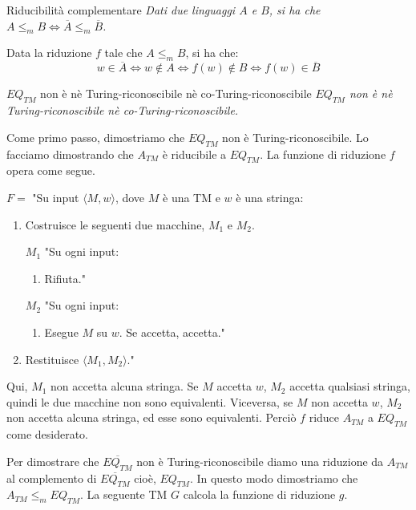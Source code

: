 \begin{Thm}{Riducibilità complementare}{}
\textit{Dati due linguaggi $A$ e $B$, si ha che $A\leq_m B\iff \overline{A}\leq_m \overline{B}$.}

\begin{demonstration}
Data la riduzione $f$ tale che $A\leq_m B$, si ha che:
\begin{equation*}
w\in \overline{A} \iff w \notin A \iff f(w) \notin B \iff f(w) \in \overline{B}
\end{equation*}
\end{demonstration}
\end{Thm}

\begin{Thm}{$EQ_{TM}$ non è nè Turing-riconoscibile nè co-Turing-riconoscibile}{}
\textit{$EQ_{TM}$ non è nè Turing-riconoscibile nè co-Turing-riconoscibile.}

\begin{demonstration}
Come primo passo, dimostriamo che $EQ_{TM}$ non è Turing-riconoscibile. Lo facciamo dimostrando che $A_{TM}$ è riducibile a $EQ_{TM}$. La funzione di riduzione $f$ opera come segue.

$F=$ "Su input $\langle M, w\rangle$, dove $M$ è una TM e $w$ è una stringa:
\begin{enumerate}
    \item Costruisce le seguenti due macchine, $M_1$ e $M_2$.

    $M_1$ "Su ogni input:
    \begin{enumerate}
        \item Rifiuta."
    \end{enumerate}
    $M_2$ "Su ogni input:
    \begin{enumerate}
        \item Esegue $M$ su $w$. Se accetta, accetta."
    \end{enumerate}
    \item Restituisce $\langle M_1, M_2\rangle$."
\end{enumerate}
Qui, $M_{1}$ non accetta alcuna stringa. Se $M$ accetta $w$, $M_{2}$ accetta qualsiasi stringa, quindi le due macchine non sono equivalenti. Viceversa, se $M$ non accetta $w$, $M_{2}$ non accetta alcuna stringa, ed esse sono equivalenti. Perciò $f$ riduce $A_{TM}$ a $EQ_{TM}$ come desiderato.

Per dimostrare che $\overline{EQ_{TM}}$ non è Turing-riconoscibile diamo una riduzione da $A_{TM}$ al complemento di $\overline{EQ_{TM}}$ cioè, $EQ_{TM}$. In questo modo dimostriamo che $A_{TM}\leq_m EQ_{TM}$. La seguente TM $G$ calcola la funzione di riduzione $g$.


\end{demonstration}
\end{Thm}
